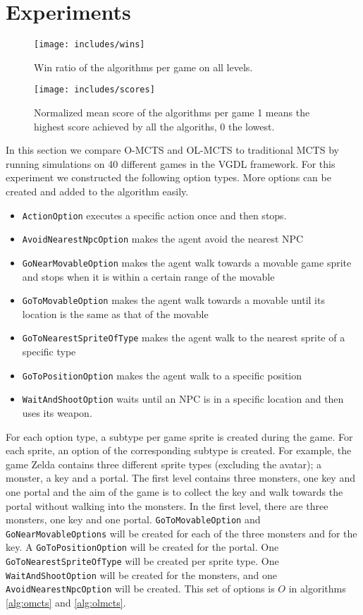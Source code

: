 \section{Experiments}
\label{sec:experiments}
\begin{figure*}
	\centering
	\texttt{[image: includes/wins]}
	\caption{Win ratio of the algorithms per game on all levels.}
	\label{fig:wins}
\end{figure*}

\begin{figure*}
	\centering
	\texttt{[image: includes/scores]}
	\caption{Normalized mean score of the algorithms per game 1 means the
	highest score achieved by all the algoriths, 0 the lowest.}
	\label{fig:scores}
\end{figure*}

In this section we compare O-MCTS and OL-MCTS to traditional MCTS by running
simulations on 40 different games in the VGDL framework. For this experiment
we constructed the following option types. More options can be created and added
to the algorithm easily.

\begin{itemize}[noitemsep]
	\item \texttt{ActionOption} executes a specific action once and then
		stops.
	\item \texttt{AvoidNearestNpcOption} makes the agent avoid the nearest NPC
	\item \texttt{GoNearMovableOption} makes the agent walk towards a
		movable game sprite and stops when it is within a certain range of the
		movable
	\item \texttt{GoToMovableOption} makes the agent walk towards a
		movable until its location is the same as that of the movable
	\item \texttt{GoToNearestSpriteOfType} makes the agent walk to the nearest sprite of
		a specific type
	\item \texttt{GoToPositionOption} makes the agent walk to a specific position
	\item \texttt{WaitAndShootOption} waits until an NPC is in a specific location and
		then uses its weapon.
\end{itemize}

For each option type, a subtype per game sprite is created during the game. For
each sprite, an option of the corresponding subtype is created. For example, the
game Zelda contains three different sprite types (excluding the avatar); a
monster, a key and a portal. The first level contains three monsters, one key
and one portal and the aim of the game is to collect the key and walk towards
the portal without walking into the monsters. In the first level, there are
three monsters, one key and one portal. \texttt{GoToMovableOption} and
\texttt{GoNearMovableOptions} will be created for each of the three monsters and
for the key. A \texttt{GoToPositionOption} will be created for the portal.
One \texttt{GoToNearestSpriteOfType} will be created per sprite type. One
\texttt{WaitAndShootOption} will be created for the monsters, and one
\texttt{AvoidNearestNpcOption} will be
created. This set of options is $O$ in algorithms \ref{alg:omcts} and
\ref{alg:olmcts}.

